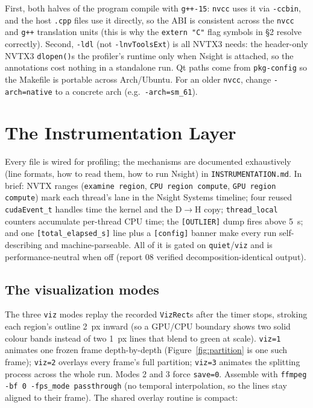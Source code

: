 \documentclass[
	english,
	letterpaper, oneside
]{article}
\begin{document}
First, both halves of the program compile with \texttt{g++-15}: \texttt{nvcc} uses
it via \texttt{-ccbin}, and the host \texttt{.cpp} files use it directly, so the
ABI is consistent across the \texttt{nvcc} and \texttt{g++} translation units (this
is why the \texttt{extern "C"} flag symbols in \S2 resolve correctly). Second,
\texttt{-ldl} (not \texttt{-lnvToolsExt}) is all NVTX3 needs: the header-only NVTX3
\texttt{dlopen()}s the profiler's runtime only when Nsight is attached, so the
annotations cost nothing in a standalone run. Qt paths come from \texttt{pkg-config}
so the Makefile is portable across Arch/Ubuntu. For an older \texttt{nvcc}, change
\texttt{-arch=native} to a concrete arch (e.g.\ \texttt{-arch=sm\_61}).

\section{The Instrumentation Layer}

Every file is wired for profiling; the mechanisms are documented exhaustively (line
formats, how to read them, how to run Nsight) in \texttt{INSTRUMENTATION.md}. In
brief: NVTX ranges (\texttt{examine region}, \texttt{CPU region compute},
\texttt{GPU region compute}) mark each thread's lane in the Nsight Systems
timeline; four reused \texttt{cudaEvent\_t} handles time the kernel and the D$\to$H
copy; \texttt{thread\_local} counters accumulate per-thread CPU time; the
\texttt{[OUTLIER]} dump fires above 5~s; and one \texttt{[total\_elapsed\_s]} line
plus a \texttt{[config]} banner make every run self-describing and
machine-parseable. All of it is gated on \texttt{quiet}/\texttt{viz} and is
performance-neutral when off (report 08 verified decomposition-identical output).

\subsection{The visualization modes}
\label{sec:viz}

The three \texttt{viz} modes replay the recorded \texttt{VizRect}s after the timer
stops, stroking each region's outline 2~px inward (so a GPU/CPU boundary
shows two solid colour bands instead of two 1~px lines that blend to green at
scale). \texttt{viz=1} animates one frozen frame depth-by-depth (Figure~\ref{fig:partition}
is one such frame); \texttt{viz=2} overlays every frame's full partition;
\texttt{viz=3} animates the splitting process across the whole run. Modes 2 and 3
force \texttt{save=0}. Assemble with \texttt{ffmpeg -bf 0 -fps\_mode passthrough}
(no temporal interpolation, so the lines stay aligned to their frame). The shared
overlay routine is compact:
\end{document}
